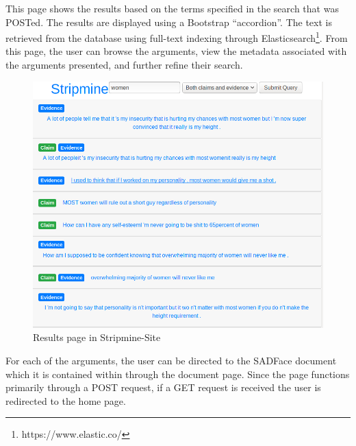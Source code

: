 \documentclass[12pt,a4paper]{article}
\begin{document}
This page shows the results based on the terms specified in the search that was POSTed. The results are displayed using a Bootstrap ``accordion''. The text is retrieved from the database using full-text indexing through Elasticsearch\footnote{https://www.elastic.co/}. From this page, the user can browse the arguments, view the metadata associated with the arguments presented, and further refine their search.
\newline
\begin{figure}[H]
    \centering
    \includegraphics[scale=0.35]{Report/graphics/results-1.png}
    \caption{Results page in Stripmine-Site}
    \label{fig:results1}
\end{figure}

For each of the arguments, the user can be directed to the SADFace document which it is contained within through the document page. Since the page functions primarily through a POST request, if a GET request is received the user is redirected to the home page.
\end{document}
